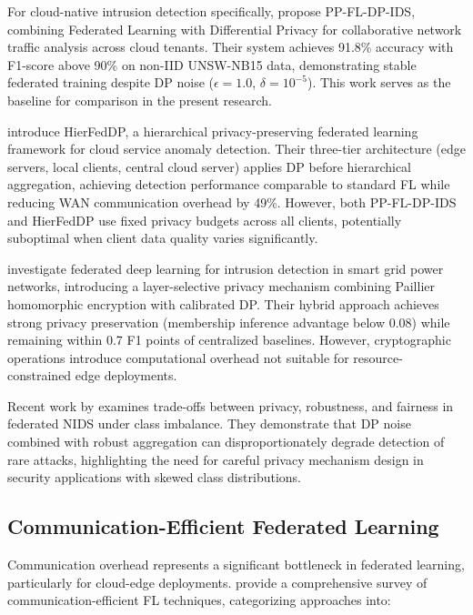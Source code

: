 For cloud-native intrusion detection specifically, \citet{saklani2026privacy} propose PP-FL-DP-IDS, combining Federated Learning with Differential Privacy for collaborative network traffic analysis across cloud tenants. Their system achieves 91.8\% accuracy with F1-score above 90\% on non-IID UNSW-NB15 data, demonstrating stable federated training despite DP noise ($\epsilon=1.0$, $\delta=10^{-5}$). This work serves as the baseline for comparison in the present research.

\citet{li2026privacy} introduce HierFedDP, a hierarchical privacy-preserving federated learning framework for cloud service anomaly detection. Their three-tier architecture (edge servers, local clients, central cloud server) applies DP before hierarchical aggregation, achieving detection performance comparable to standard FL while reducing WAN communication overhead by 49\%. However, both PP-FL-DP-IDS and HierFedDP use fixed privacy budgets across all clients, potentially suboptimal when client data quality varies significantly.

\citet{chen2026federated} investigate federated deep learning for intrusion detection in smart grid power networks, introducing a layer-selective privacy mechanism combining Paillier homomorphic encryption with calibrated DP. Their hybrid approach achieves strong privacy preservation (membership inference advantage below 0.08) while remaining within 0.7 F1 points of centralized baselines. However, cryptographic operations introduce computational overhead not suitable for resource-constrained edge deployments.

Recent work by \citet{tory2026privacy} examines trade-offs between privacy, robustness, and fairness in federated NIDS under class imbalance. They demonstrate that DP noise combined with robust aggregation can disproportionately degrade detection of rare attacks, highlighting the need for careful privacy mechanism design in security applications with skewed class distributions.

\subsection{Communication-Efficient Federated Learning}

Communication overhead represents a significant bottleneck in federated learning, particularly for cloud-edge deployments. \citet{jia2025comprehensive} provide a comprehensive survey of communication-efficient FL techniques, categorizing approaches into:


